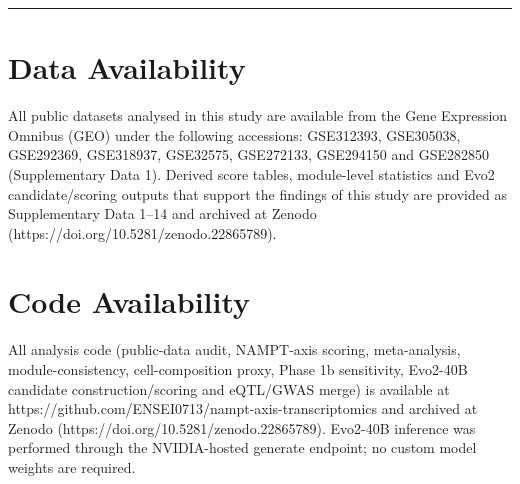 \documentclass[11pt]{article}
\begin{document}
\vspace{4pt}\hrule\vspace{8pt}
\section*{Data Availability}
All public datasets analysed in this study are available from the Gene Expression Omnibus (GEO) under the following accessions: GSE312393, GSE305038, GSE292369, GSE318937, GSE32575, GSE272133, GSE294150 and GSE282850 (Supplementary Data 1). Derived score tables, module-level statistics and Evo2 candidate/scoring outputs that support the findings of this study are provided as Supplementary Data 1–14 and archived at Zenodo (https://doi.org/10.5281/zenodo.22865789).

\section*{Code Availability}
All analysis code (public-data audit, NAMPT-axis scoring, meta-analysis, module-consistency, cell-composition proxy, Phase 1b sensitivity, Evo2-40B candidate construction/scoring and eQTL/GWAS merge) is available at https://github.com/ENSEI0713/nampt-axis-transcriptomics and archived at Zenodo (https://doi.org/10.5281/zenodo.22865789). Evo2-40B inference was performed through the NVIDIA-hosted generate endpoint; no custom model weights are required.
\end{document}
